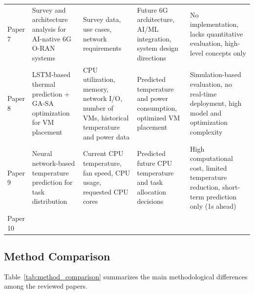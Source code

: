 \documentclass[12pt,a4paper]{article}
\begin{document}
\begin{table}[H]
\begin{tabular}{p{2cm} p{3cm} p{3cm} p{3cm} p{3cm}}
                        Paper 7 & Survey and architecture analysis for AI-native 6G O-RAN systems & Survey data, use cases, network requirements & Future 6G architecture, AI/ML integration, system design directions & No implementation, lacks quantitative evaluation, high-level concepts only \\
                        
                        Paper 8 & LSTM-based thermal prediction + GA-SA optimization for VM placement & CPU utilization, memory, network I/O, number of VMs, historical temperature and power data & Predicted temperature and power consumption, optimized VM placement & Simulation-based evaluation, no real-time deployment, high model and optimization complexity\\
                        
                        Paper 9 & Neural network-based temperature prediction for task distribution & Current CPU temperature, fan speed, CPU usage, requested CPU cores & Predicted future CPU temperature and task allocation decisions & High computational cost, limited temperature reduction, short-term prediction only (1s ahead) \\
                        
                        Paper 10 &  &  &  &  \\
                        \bottomrule
                        \end{tabular}
                \end{table}

    \subsection{Method Comparison}
                Table~\ref{tab:method_comparison} summarizes the main methodological differences among the reviewed papers.
\end{document}
